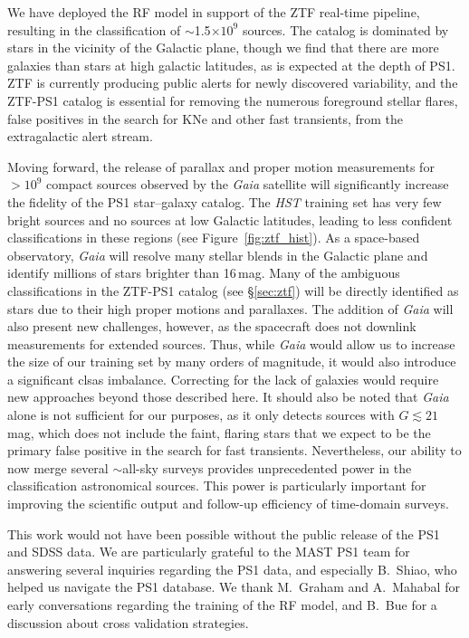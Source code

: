 \documentclass[twocolumn]{aastex62}
\begin{document}
We have deployed the RF model in support of the ZTF real-time pipeline,
resulting in the classification of $\sim$1.5$\times 10^{9}$ sources. The
catalog is dominated by stars in the vicinity of the Galactic plane, though
we find that there are more galaxies than stars at high galactic latitudes,
as is expected at the depth of PS1. ZTF is currently producing public alerts
for newly discovered variability, and the ZTF-PS1 catalog is essential for
removing the numerous foreground stellar flares, false positives in the
search for KNe and other fast transients, from the extragalactic alert
stream.

Moving forward, the release of parallax and proper motion measurements for
$> 10^{9}$ compact sources observed by the \textit{Gaia} satellite
\citep{GaiaDR2} will significantly increase the fidelity of the PS1
star--galaxy catalog. The \textit{HST} training set has very few bright
sources and no sources at low Galactic latitudes, leading to less confident
classifications in these regions (see Figure~\ref{fig:ztf_hist}). As a
space-based observatory, \textit{Gaia} will resolve many stellar blends in
the Galactic plane and identify millions of stars brighter than 16\,mag.
Many of the ambiguous classifications in the ZTF-PS1 catalog (see
\S\ref{sec:ztf}) will be directly identified as stars due to their high
proper motions and parallaxes. The addition of \textit{Gaia} will also
present new challenges, however, as the spacecraft does not downlink
measurements for extended sources. Thus, while \textit{Gaia} would allow us
to increase the size of our training set by many orders of magnitude, it
would also introduce a significant clsas imbalance. Correcting for the lack
of galaxies would require new approaches beyond those described here. It
should also be noted that \textit{Gaia} alone is not sufficient for our
purposes, as it only detects sources with $G \lesssim 21$\,mag, which does
not include the faint, flaring stars that we expect to be the primary false
positive in the search for fast transients. Nevertheless, our ability to now
merge several $\sim$all-sky surveys provides unprecedented power in the
classification astronomical sources. This power is particularly important
for improving the scientific output and follow-up efficiency of time-domain
surveys.

\acknowledgements

This work would not have been possible without the public release of the PS1
and SDSS data. We are particularly grateful to the MAST PS1 team for
answering several inquiries regarding the PS1 data, and especially B.~Shiao,
who helped us navigate the PS1 database. We thank M.~Graham and A.~Mahabal
for early conversations regarding the training of the RF model, and B.~Bue
for a discussion about cross validation strategies.
\end{document}
